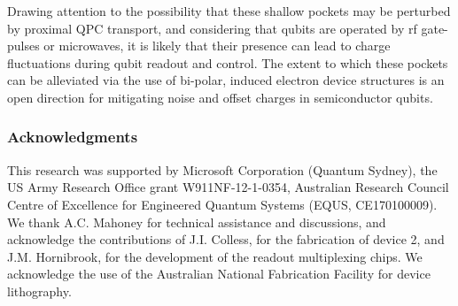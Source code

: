 Drawing attention to the possibility that these shallow pockets may be perturbed by proximal QPC transport, and considering that qubits are operated by rf gate-pulses or microwaves, it is likely that their presence can lead to charge fluctuations during qubit readout and control. The extent to which these pockets can be alleviated via the use of bi-polar, induced electron device structures \cite{PhysRevLett.89.246801,PhysRevApplied.6.054013} is an open direction for mitigating noise and offset charges in semiconductor qubits.

\subsubsection{Acknowledgments}
This research was supported by Microsoft Corporation (Quantum Sydney), the US Army Research Office grant W911NF-12-1-0354, Australian Research Council Centre of Excellence for Engineered Quantum Systems (EQUS, CE170100009). We thank A.C. Mahoney for technical assistance and discussions, and acknowledge the contributions of J.I. Colless, for the fabrication of device 2, and J.M. Hornibrook, for the development of the readout multiplexing chips. We acknowledge the use of the Australian National Fabrication Facility for device lithography.
